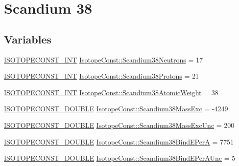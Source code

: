 \hypertarget{group___isotope_const-_scandium-_sc38}{}\section{Scandium 38}
\label{group___isotope_const-_scandium-_sc38}
\subsection*{Variables}
\begin{DoxyCompactItemize}
\item 
\mbox{\hyperlink{group___isotope_const-_macros_ga5f18360b3e99483a35c32d789e62621c}{I\+S\+O\+T\+O\+P\+E\+C\+O\+N\+S\+T\+\_\+\+I\+NT}} \mbox{\hyperlink{group___isotope_const-_scandium-_sc38_ga3b26eeab79e9b82caf7ba5ea226dccfb}{Isotope\+Const\+::\+Scandium38\+Neutrons}} = 17
\item 
\mbox{\hyperlink{group___isotope_const-_macros_ga5f18360b3e99483a35c32d789e62621c}{I\+S\+O\+T\+O\+P\+E\+C\+O\+N\+S\+T\+\_\+\+I\+NT}} \mbox{\hyperlink{group___isotope_const-_scandium-_sc38_gab9be9953827bc012fc7d55dbade617be}{Isotope\+Const\+::\+Scandium38\+Protons}} = 21
\item 
\mbox{\hyperlink{group___isotope_const-_macros_ga5f18360b3e99483a35c32d789e62621c}{I\+S\+O\+T\+O\+P\+E\+C\+O\+N\+S\+T\+\_\+\+I\+NT}} \mbox{\hyperlink{group___isotope_const-_scandium-_sc38_ga6298b048abe1a24172d0d1f7b8e350dd}{Isotope\+Const\+::\+Scandium38\+Atomic\+Weight}} = 38
\item 
\mbox{\hyperlink{group___isotope_const-_macros_ga8f45a7272ce02c0b4c65c44636ed719a}{I\+S\+O\+T\+O\+P\+E\+C\+O\+N\+S\+T\+\_\+\+D\+O\+U\+B\+LE}} \mbox{\hyperlink{group___isotope_const-_scandium-_sc38_ga5c0c86a35e3afce936d5244735ae5a15}{Isotope\+Const\+::\+Scandium38\+Mass\+Exc}} = -\/4249
\item 
\mbox{\hyperlink{group___isotope_const-_macros_ga8f45a7272ce02c0b4c65c44636ed719a}{I\+S\+O\+T\+O\+P\+E\+C\+O\+N\+S\+T\+\_\+\+D\+O\+U\+B\+LE}} \mbox{\hyperlink{group___isotope_const-_scandium-_sc38_ga0d8c01b2a2241bcce9bae3cae62ec22f}{Isotope\+Const\+::\+Scandium38\+Mass\+Exc\+Unc}} = 200
\item 
\mbox{\hyperlink{group___isotope_const-_macros_ga8f45a7272ce02c0b4c65c44636ed719a}{I\+S\+O\+T\+O\+P\+E\+C\+O\+N\+S\+T\+\_\+\+D\+O\+U\+B\+LE}} \mbox{\hyperlink{group___isotope_const-_scandium-_sc38_ga99d56a85928f3fceea1bb95413766a2a}{Isotope\+Const\+::\+Scandium38\+Bind\+E\+PerA}} = 7751
\item 
\mbox{\hyperlink{group___isotope_const-_macros_ga8f45a7272ce02c0b4c65c44636ed719a}{I\+S\+O\+T\+O\+P\+E\+C\+O\+N\+S\+T\+\_\+\+D\+O\+U\+B\+LE}} \mbox{\hyperlink{group___isotope_const-_scandium-_sc38_ga272fc6c5b8a545baf3f9454b09401d65}{Isotope\+Const\+::\+Scandium38\+Bind\+E\+Per\+A\+Unc}} = 5

\end{DoxyCompactItemize}
